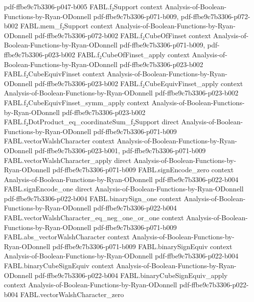 \begin{theorem}
  {pdf-ffbe9c7b3306-p047-b005}
\proofstep
  {FABL.f₂Support}
  {context}
  {Analysis-of-Boolean-Functions-by-Ryan-ODonnell}
  {pdf-ffbe9c7b3306-p071-b009,
    pdf-ffbe9c7b3306-p072-b002}
\proofstep
  {FABL.mem_f₂Support}
  {context}
  {Analysis-of-Boolean-Functions-by-Ryan-ODonnell}
  {pdf-ffbe9c7b3306-p072-b002}
\proofstep
  {FABL.f₂CubeOfFinset}
  {context}
  {Analysis-of-Boolean-Functions-by-Ryan-ODonnell}
  {pdf-ffbe9c7b3306-p071-b009,
    pdf-ffbe9c7b3306-p023-b002}
\proofstep
  {FABL.f₂CubeOfFinset_apply}
  {context}
  {Analysis-of-Boolean-Functions-by-Ryan-ODonnell}
  {pdf-ffbe9c7b3306-p023-b002}
\proofstep
  {FABL.f₂CubeEquivFinset}
  {context}
  {Analysis-of-Boolean-Functions-by-Ryan-ODonnell}
  {pdf-ffbe9c7b3306-p023-b002}
\proofstep
  {FABL.f₂CubeEquivFinset_apply}
  {context}
  {Analysis-of-Boolean-Functions-by-Ryan-ODonnell}
  {pdf-ffbe9c7b3306-p023-b002}
\proofstep
  {FABL.f₂CubeEquivFinset_symm_apply}
  {context}
  {Analysis-of-Boolean-Functions-by-Ryan-ODonnell}
  {pdf-ffbe9c7b3306-p023-b002}
\proofstep
  {FABL.f₂DotProduct_eq_coordinateSum_f₂Support}
  {direct}
  {Analysis-of-Boolean-Functions-by-Ryan-ODonnell}
  {pdf-ffbe9c7b3306-p071-b009}
\proofstep
  {FABL.vectorWalshCharacter}
  {context}
  {Analysis-of-Boolean-Functions-by-Ryan-ODonnell}
  {pdf-ffbe9c7b3306-p023-b001,
    pdf-ffbe9c7b3306-p071-b009}
\proofstep
  {FABL.vectorWalshCharacter_apply}
  {direct}
  {Analysis-of-Boolean-Functions-by-Ryan-ODonnell}
  {pdf-ffbe9c7b3306-p071-b009}
\proofstep
  {FABL.signEncode_zero}
  {context}
  {Analysis-of-Boolean-Functions-by-Ryan-ODonnell}
  {pdf-ffbe9c7b3306-p022-b004}
\proofstep
  {FABL.signEncode_one}
  {direct}
  {Analysis-of-Boolean-Functions-by-Ryan-ODonnell}
  {pdf-ffbe9c7b3306-p022-b004}
\proofstep
  {FABL.binarySign_one}
  {context}
  {Analysis-of-Boolean-Functions-by-Ryan-ODonnell}
  {pdf-ffbe9c7b3306-p022-b004}
\proofstep
  {FABL.vectorWalshCharacter_eq_neg_one_or_one}
  {context}
  {Analysis-of-Boolean-Functions-by-Ryan-ODonnell}
  {pdf-ffbe9c7b3306-p071-b009}
\proofstep
  {FABL.abs_vectorWalshCharacter}
  {context}
  {Analysis-of-Boolean-Functions-by-Ryan-ODonnell}
  {pdf-ffbe9c7b3306-p071-b009}
\proofstep
  {FABL.binarySignEquiv}
  {context}
  {Analysis-of-Boolean-Functions-by-Ryan-ODonnell}
  {pdf-ffbe9c7b3306-p022-b004}
\proofstep
  {FABL.binaryCubeSignEquiv}
  {context}
  {Analysis-of-Boolean-Functions-by-Ryan-ODonnell}
  {pdf-ffbe9c7b3306-p022-b004}
\proofstep
  {FABL.binaryCubeSignEquiv_apply}
  {context}
  {Analysis-of-Boolean-Functions-by-Ryan-ODonnell}
  {pdf-ffbe9c7b3306-p022-b004}
\proofstep
  {FABL.vectorWalshCharacter_zero}

\end{theorem}
